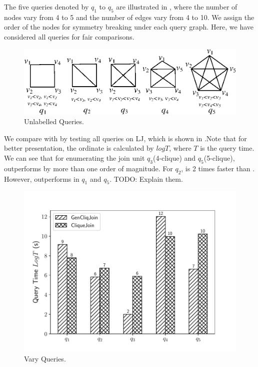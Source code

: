  The five queries denoted by $q_1$ to $q_5$ are illustrated in , where the number of nodes vary from 4 to 5 and the number of edges vary from 4 to 10. We assign the order of the nodes for symmetry breaking\cite{Grochow2007} under each query graph. Here, we have considered all queries for fair comparisons.

\begin{figure}[htb]
  \centering
  \includegraphics[scale=0.6]{figures/unlq.eps}
  \caption{\small{Unlabelled Queries.}}
  \label{fig:unlq}
\end{figure}

 We compare \gencliqjoin with \cliquejoin by testing all queries on LJ, which is shown in .Note that for better presentation, the ordinate is calculated by $logT$, where $T$ is the query time. We can see that for enumerating the join unit $q_3$(4-clique) and $q_5$(5-clique), \gencliqjoin outperforms \cliquejoin by more than one order of magnitude. For $q_2$, \gencliqjoin is 2 times faster than \cliquejoin. However, \cliquejoin outperforms \gencliqjoin in $q_1$ and $q_5$. TODO: Explain them.

\begin{figure}[htb]
  \centering
  \includegraphics[scale=0.4]{figures/exp1.pdf}
  \caption{\small{Vary Queries.}}
  \label{fig:vary_query}
\end{figure}

